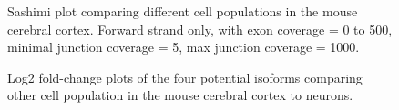 \begin{figure}
  \centering
  \caption{Sashimi plot comparing different cell populations in the mouse cerebral cortex. Forward strand only, with exon coverage = 0 to 500, minimal junction coverage = 5, max junction coverage = 1000.}
  \label{sense celltype splicing}
\end{figure}

\begin{figure}
  \centering
  \caption{Log2 fold-change plots of the four potential isoforms comparing other cell population in the mouse cerebral cortex to neurons.}
  \label{sense celltype fold-change}
\end{figure}

